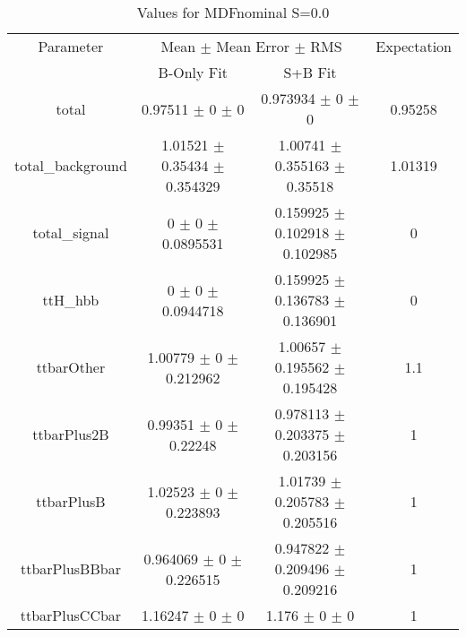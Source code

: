 \begin{table}
\centering
\caption{Values for MDFnominal S=0.0}
\begin{tabular}{cccc}
\toprule
Parameter & \multicolumn{2}{c}{Mean $\pm$ Mean Error $\pm$ RMS} & Expectation\\
 & B-Only Fit & S+B Fit & \\
\midrule
total & \num{0.97511} $\pm$ \num{0} $\pm$ \num{0} & \num{0.973934} $\pm$ \num{0} $\pm$ \num{0} & \num{0.95258}\\
total\_background & \num{1.01521} $\pm$ \num{0.35434} $\pm$ \num{0.354329} & \num{1.00741} $\pm$ \num{0.355163} $\pm$ \num{0.35518} & \num{1.01319}\\
total\_signal & \num{0} $\pm$ \num{0} $\pm$ \num{0.0895531} & \num{0.159925} $\pm$ \num{0.102918} $\pm$ \num{0.102985} & \num{0}\\
ttH\_hbb & \num{0} $\pm$ \num{0} $\pm$ \num{0.0944718} & \num{0.159925} $\pm$ \num{0.136783} $\pm$ \num{0.136901} & \num{0}\\
ttbarOther & \num{1.00779} $\pm$ \num{0} $\pm$ \num{0.212962} & \num{1.00657} $\pm$ \num{0.195562} $\pm$ \num{0.195428} & \num{1.1}\\
ttbarPlus2B & \num{0.99351} $\pm$ \num{0} $\pm$ \num{0.22248} & \num{0.978113} $\pm$ \num{0.203375} $\pm$ \num{0.203156} & \num{1}\\
ttbarPlusB & \num{1.02523} $\pm$ \num{0} $\pm$ \num{0.223893} & \num{1.01739} $\pm$ \num{0.205783} $\pm$ \num{0.205516} & \num{1}\\
ttbarPlusBBbar & \num{0.964069} $\pm$ \num{0} $\pm$ \num{0.226515} & \num{0.947822} $\pm$ \num{0.209496} $\pm$ \num{0.209216} & \num{1}\\
ttbarPlusCCbar & \num{1.16247} $\pm$ \num{0} $\pm$ \num{0} & \num{1.176} $\pm$ \num{0} $\pm$ \num{0} & \num{1}\\
\bottomrule
\end{tabular}
\end{table}